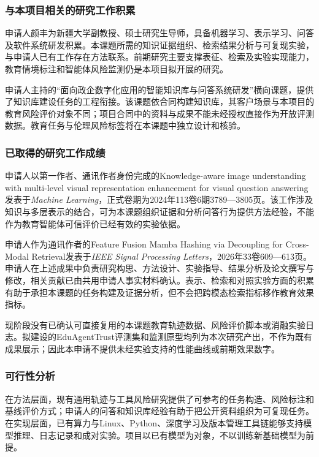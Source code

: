 \justifying
\NSFCBodyText

\subsubsection{与本项目相关的研究工作积累}

申请人颜丰为新疆大学副教授、硕士研究生导师，具备机器学习、表示学习、问答及软件系统研发积累。本课题所需的知识证据组织、检索结果分析与可复现实验，与申请人已有工作存在方法联系。前期研究主要支撑表征、检索及实验实现能力，教育情境标注和智能体风险监测仍是本项目拟开展的研究。

申请人主持的“面向政企数字化应用的智能知识库与问答系统研发”横向课题，提供了知识库建设任务的工程衔接。该课题依合同构建知识库，其客户场景与本项目的教育风险评价对象不同；项目合同中的资料与成果不能未经授权直接作为开放评测数据。教育任务与伦理风险标签将在本课题中独立设计和核验。

\subsubsection{已取得的研究工作成绩}

申请人以第一作者、通讯作者身份完成的Knowledge-aware image understanding with multi-level visual representation enhancement for visual question answering发表于\textit{Machine Learning}，正式卷期为2024年113卷6期3789—3805页\cite{yan2024knowledge}。该工作涉及知识与多层表示的结合，可为本课题组织证据和分析问答行为提供方法经验，不能作为教育智能体可信评价已经有效的实验依据。

申请人作为通讯作者的Feature Fusion Mamba Hashing via Decoupling for Cross-Modal Retrieval发表于\textit{IEEE Signal Processing Letters}，2026年33卷609—613页\cite{tang2026hashing}。申请人在上述成果中负责研究构思、方法设计、实验指导、结果分析及论文撰写与修改，相关贡献已由共用申请人事实材料确认。表示、检索和对照实验方面的积累有助于承担本课题的任务构建及证据分析，但不会把跨模态检索指标移作教育效果指标。

现阶段没有已确认可直接复用的本课题教育轨迹数据、风险评价脚本或消融实验日志。拟建设的EduAgentTrust评测集和监测原型均列为本次研究产出，不作为既有成果展示；因此本申请不提供未经实验支持的性能曲线或前期效果数字。

\subsubsection{可行性分析}

在方法层面，现有通用轨迹与工具风险研究提供了可参考的任务构造、风险标注和基线评价方式；申请人的问答和知识库经验有助于把公开资料组织为可复现任务。在实现层面，已有算力与Linux、Python、深度学习及版本管理工具链能够支持模型推理、日志记录和成对实验。项目以已有模型为对象，不以训练新基础模型为前提。

